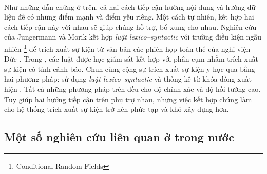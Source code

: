 \\
\noindent Như những dẫn chứng ở trên, cả hai cách tiếp cận hướng nội dung và hướng dữ liệu đề có những điểm mạnh và điểm yếu riêng. Một cách tự nhiên, kết hợp hai cách tiếp cận này với nhau sẽ giúp chúng hỗ trợ, bổ xung cho nhau. Nghiên cứu của Jungermann và Morik kết hợp \emph{luật lexico--syntactic} với trường điều kiện ngẫu nhiên \footnote{Conditional Random Fields} để trích xuất sự kiện từ văn bản các phiên họp toàn thể của nghị viện Đức \cite{FK08}. Trong \cite{JHP07}, các luật được học giám sát kết hợp với phân cụm nhằm trích xuất sự kiện có tính cảnh báo. Chun cùng cộng sự trích xuất sự kiện y học qua bằng hai phương pháp: sử dụng \emph{luật lexico--syntactic} và thống kê từ khóa đồng xuất hiện \cite{CHR04}. Tất cả những phương pháp trên đều cho độ chính xác và độ hồi tưởng cao. Tuy giúp hai hướng tiếp cận trên phụ trợ nhau, nhưng việc kết hợp chúng làm cho hệ thống trích xuất sự kiện trở nên phức tạp và khó xây dựng hơn.




	\subsection{Một số nghiên cứu liên quan ở trong nước}

